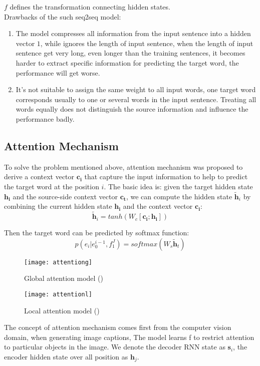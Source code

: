  $f$ defines the transformation connecting hidden states.  \\








%
%

Drawbacks of the such seq2seq model:
\begin{enumerate}
	\item The model compresses all information from the input sentence into a hidden vector ${1}$, while ignores the length of input sentence, when the length of input sentence get very long, even longer than the training sentences, it becomes harder to extract specific information for predicting the target word, the performance will get worse.
	\item It's not suitable to assign the same weight to all input words, one target word corresponds usually to one or several words in the input sentence. Treating all words equally does not distinguish the source information and influence the performance badly.
\end{enumerate}

\subsection{Attention Mechanism}
To solve the problem mentioned above, attention mechanism was proposed to derive a context vector ${\bm{c_i}}$ that capture the input information to help to predict the target word at the position ${i}$. The basic idea is: given the target hidden state ${\bm{h_i}}$ and the source-side context vector $\bm{c_t}$, we can compute the hidden state ${\tilde{\bm{h}}_i}$ by combining the current hidden state $\bm{h_i}$ and the context vector $\bm{c_i}$:
\[ \tilde{\bm{h}}_i = tanh(W_c[\bm{c_i}; \bm{h_i}])\]

Then the target word can be predicted by softmax function:
\[  p(e_i|e_0^{i-1}, f_1^J) = softmax(W_s \tilde{\bm{h}}_t)\] 

\begin{figure}[t]
	\texttt{[image: attentiong]}
	\caption{Global attention model (\cite{luong2015effective})}
	\centering
\end{figure}

\begin{figure}[t]
	\texttt{[image: attentionl]}
	\caption{Local attention model (\cite{luong2015effective})}
	\centering
\end{figure}
The concept of attention mechanism comes first from the computer vision domain, when generating image captions,  The model learns f to restrict attention to particular objects in the image.
We denote the decoder RNN state as $\bm{s}_i$, the encoder hidden state over all position as $\bm{h}_j$.\\

